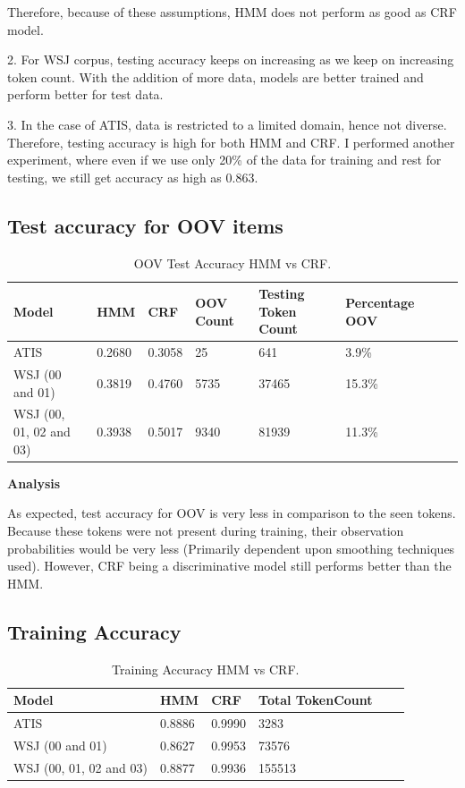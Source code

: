 Therefore, because of these assumptions, HMM does not perform as good as CRF model.

2. For WSJ corpus, testing accuracy keeps on increasing as we keep on increasing token count. With the addition of more data, models are better trained and perform better for test data. 

3. In the case of ATIS, data is restricted to a limited domain, hence not diverse. Therefore, testing accuracy is high for both HMM and CRF. I performed another experiment, where even if we use only 20\% of the data for training and rest for testing, we still get accuracy as high as 0.863.

\subsection {Test accuracy for OOV items}
\begin{center}	
	\begin{table}[ht]
  	\centering
   	\begin{tabular}{| l | l | l | l | l | l | l | l |}
    	\hline
        Model & HMM & CRF & OOV Count & Testing Token Count & Percentage OOV \\ \hline
        ATIS & 0.2680 & 0.3058 &  25 & 641 & 3.9\%\\ \hline
        WSJ (00 and 01) & 0.3819 & 0.4760 & 5735 & 37465 & 15.3\% \\ \hline
	WSJ (00, 01, 02 and 03) & 0.3938 & 0.5017 & 9340 & 81939 & 11.3\% \\ \hline
    	\end{tabular}
    	\caption{OOV Test Accuracy HMM vs CRF. }
    	\end{table}%
\end{center}

{\bfseries Analysis}

As expected, test accuracy for OOV is very less in comparison to the seen tokens. Because these tokens were not present during training, their observation probabilities would be very less (Primarily dependent upon smoothing techniques used). However, CRF being a discriminative model still performs better than the HMM.

\subsection {Training Accuracy}

\begin{center}	
	\begin{table}[ht]
  	\centering
   	\begin{tabular}{| l | l | l | l | l | l |}
    	\hline
        Model & HMM & CRF & Total TokenCount \\ \hline
        ATIS & 0.8886 & 0.9990 &  3283 \\ \hline
        WSJ (00 and 01) & 0.8627 & 0.9953 & 73576 \\ \hline
	WSJ (00, 01, 02 and 03) & 0.8877 & 0.9936 & 155513 \\ \hline
    	\end{tabular}
    	\caption{Training Accuracy HMM vs CRF. }
    	\end{table}%
\end{center}

